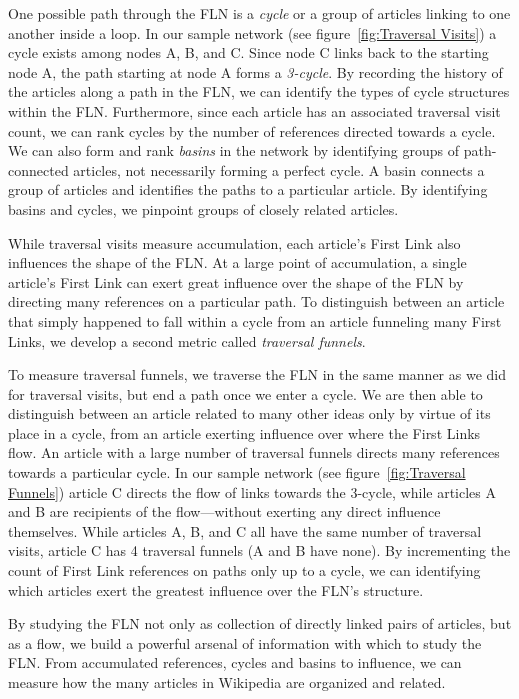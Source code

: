 \documentclass[pre,twocolumn,twoside,superscriptaddress,floatfix, aps, 10pt]{revtex4-1}
\begin{document}
One possible path through the FLN is a {\it cycle} or a group of articles 
linking to one another inside a loop. In our sample network 
(see figure~\ref{fig:Traversal Visits}) 
a cycle exists among nodes A, B, and C. 
Since node C links back to the starting node A, the path starting at node A forms a {\it 3-cycle}. 
By recording the history of the articles along a path in the FLN, we can identify
the types of cycle structures within the FLN. Furthermore, since each article 
has an associated traversal visit count, we can rank cycles by 
the number of references directed towards a cycle. 
We can also form and rank {\it basins} in the network by identifying groups of 
path-connected articles, not necessarily forming a perfect cycle.
A basin connects a group of articles and identifies the paths 
to a particular article.
By identifying basins and cycles, we pinpoint groups of closely related articles.


While traversal visits measure accumulation, each article's First Link also 
influences the shape of the FLN. 
At a large point of accumulation, a single article's First Link 
can exert great influence over the shape of the FLN by directing many
references on a particular path. To distinguish between an article 
that simply happened to fall within a cycle from an article funneling 
many First Links, we develop a second metric called {\it traversal funnels}.

To measure traversal funnels, we traverse the FLN in the same manner as we 
did for traversal visits, but end a path once we enter a cycle.
We are then able to distinguish between an article related to many other ideas
only by virtue of its place in a cycle, from an article exerting influence over where the First Links flow. 
An article with a large number of traversal funnels directs many references
towards a particular cycle. In our sample network 
(see figure~\ref{fig:Traversal Funnels}) article C 
directs the flow of links towards the 3-cycle, while articles A and B are 
recipients of the flow---without exerting any direct influence themselves. 
While articles A, B, and C all have the same number of traversal visits, 
article C has 4 traversal funnels (A and B have none). By incrementing the count of 
First Link references on paths only up to a cycle, we can identifying which articles
exert the greatest influence over the FLN's structure.

By studying the FLN not only as collection of directly linked pairs of articles, but
as a flow, 
we build a powerful arsenal of information with which to study the FLN. 
From accumulated references, cycles and basins to influence, we can measure how the many articles in Wikipedia are organized and related.
\end{document}
